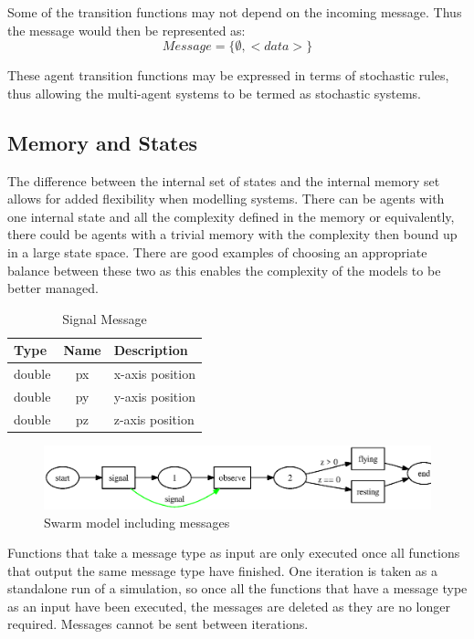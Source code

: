  Some of the transition functions may not depend on the incoming
 message. Thus the message would then be represented as:
 \begin{equation}\label{msg}
     Message = \{ \emptyset, <data> \}
 \end{equation}

 These agent transition functions may be expressed in terms of
 stochastic rules, thus allowing the multi-agent systems to be termed
 as stochastic systems.

 \subsection{Memory and States}
 The difference between the internal set of states and the internal
 memory set allows for added flexibility when modelling systems.
 There can be agents with one internal state and all the complexity
 defined in the memory or equivalently, there could be agents with
 a trivial memory with the complexity then bound up in a large state
 space. There are good examples of choosing an appropriate balance
 between these two as this enables the complexity of the models to be
 better managed.

\begin{table}[ht]
\centering
\begin{tabular}{|l||c||l|}
\hline
Type&Name&Description\\
\hline \hline
double&px&x-axis position\\
\hline
double&py&y-axis position\\
\hline
double&pz&z-axis position\\
\hline
\end{tabular}
\caption{Signal Message}
\label{tab:signal_message}
\end{table}

\begin{figure}[ht]
\begin{center}
\includegraphics*[scale=0.65]{swarm_3.ps}
\caption{Swarm model including messages}
\label{fig:swarm_3}
\end{center}
\end{figure}

Functions that take a message type as input are only executed once all functions
that output the same message type have finished. One iteration is taken as a
standalone run of a simulation, so once all the functions that have a message
type as an input have been executed, the messages are deleted as they are no
longer required. Messages cannot be sent between iterations.

